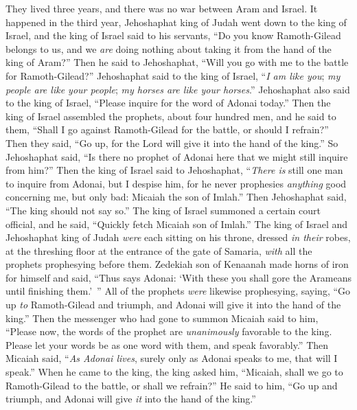 \begin{biblechapter} %
 They lived three years, and there was no war between Aram and Israel.
\verse It happened in the third year, Jehoshaphat king of Judah went down to the king of Israel,
\verse and the king of Israel said to his servants, “Do you know Ramoth-Gilead belongs to us, and we \textit{are} doing nothing about taking it from the hand of the king of Aram?”
\verse Then he said to Jehoshaphat, “Will you go with me to the battle for Ramoth-Gilead?” Jehoshaphat said to the king of Israel, “\textit{I am like you}; \textit{my people are like your people}; \textit{my horses are like your horses}.”
\verse Jehoshaphat also said to the king of Israel, “Please inquire for the word of Adonai today.”
\verse Then the king of Israel assembled the prophets, about four hundred men, and he said to them, “Shall I go against Ramoth-Gilead for the battle, or should I refrain?” Then they said, “Go up, for the Lord will give it into the hand of the king.”
\verse So Jehoshaphat said, “Is there no prophet of Adonai here that we might still inquire from him?”
\verse Then the king of Israel said to Jehoshaphat, “\textit{There is} still one man to inquire from Adonai, but I despise him, for he never prophesies \textit{anything} good concerning me, but only bad: Micaiah the son of Imlah.” Then Jehoshaphat said, “The king should not say so.”
\verse The king of Israel summoned a certain court official, and he said, “Quickly fetch Micaiah son of Imlah.”
\verse The king of Israel and Jehoshaphat king of Judah \textit{were} each sitting on his throne, dressed \textit{in their} robes, at the threshing floor at the entrance of the gate of Samaria, \textit{with} all the prophets prophesying before them.
\verse Zedekiah son of Kenaanah made horns of iron for himself and said, “Thus says Adonai: ‘With these you shall gore the Arameans until finishing them.’ ”
\verse All of the prophets \textit{were} likewise prophesying, saying, “Go up \textit{to} Ramoth-Gilead and triumph, and Adonai will give it into the hand of the king.”
\verse Then the messenger who had gone to summon Micaiah said to him, “Please now, the words of the prophet are \textit{unanimously} favorable to the king. Please let your words be as one word with them, and speak favorably.”
\verse Then Micaiah said, “\textit{As Adonai lives}, surely only as Adonai speaks to me, that will I speak.”
\verse When he came to the king, the king asked him, “Micaiah, shall we go to Ramoth-Gilead to the battle, or shall we refrain?” He said to him, “Go up and triumph, and Adonai will give \textit{it} into the hand of the king.”

\end{biblechapter}
